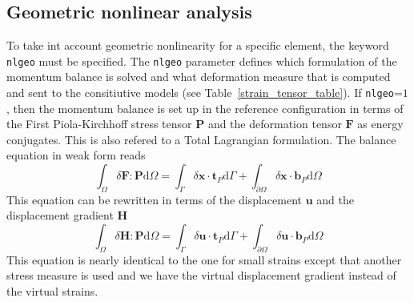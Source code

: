 \documentclass[a4paper]{article}
\newcommand{\param}[1]{\texttt{#1}} %
\begin{document}
\clearpage
\subsection{Geometric nonlinear analysis}
To take int account geometric nonlinearity for a specific element, the keyword \param{nlgeo} must be specified. The \param{nlgeo} parameter defines which formulation of the momentum balance is solved and what deformation measure that is computed and sent to the consitiutive models (see Table~\ref{strain_tensor_table}). 
If \param{nlgeo}=$1$, then the momentum balance is set up in the reference configuration in terms of the First Piola-Kirchhoff stress tensor $\mathbf{P}$ and the deformation tensor $\mathbf{F}$ as energy conjugates. This is also refered to a Total Lagrangian formulation. The balance equation in weak form reads
\begin{equation}
	\int_{\Omega} \delta \mathbf{F} : \mathbf{P} \mathrm{d} \Omega = \int_{\Gamma} \delta \mathbf{x} \cdot \mathbf{t}_P  \mathrm{d} \Gamma
	+ \int_{\partial \Omega} \delta \mathbf{x} \cdot \mathbf{b}_P  \mathrm{d} \Omega
\end{equation} 
This equation can be rewritten in terms of the displacement $\mathbf{u}$ and the displacement gradient $\mathbf{H}$ 
%
\begin{equation}
	\int_{\Omega} \delta \mathbf{H} : \mathbf{P} \mathrm{d} \Omega = \int_{\Gamma} \delta \mathbf{u} \cdot \mathbf{t}_P  \mathrm{d} \Gamma
	+ \int_{\partial \Omega} \delta \mathbf{u} \cdot \mathbf{b}_P  \mathrm{d} \Omega
\end{equation} 
This equation is nearly identical to the one for small strains except that another stress measure is used and we have the virtual displacement gradient 
instead of the virtual strains.
\end{document}
